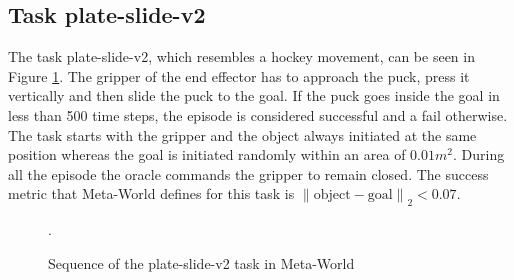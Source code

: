 \subsection{Task plate-slide-v2}
\label{subsection:metaworld-hockey-task}
The task plate-slide-v2, which resembles a hockey movement, can be seen in Figure \ref{fig:sequence-plate-slide}. The gripper of the end effector has to approach the puck, press it vertically and then slide the puck to the goal. If the puck goes inside the goal in less than 500 time steps, the episode is considered successful and a fail otherwise. The task starts with the gripper and the object always initiated at the same position whereas the goal is initiated randomly within an area of  $0.01m^2$. During all the episode the oracle commands the gripper to remain closed. The success metric that Meta-World defines for this task is ${\left\lVert \text{object}-\text{goal} \right\rVert}_2 < 0.07$.

 \begin{figure}[H]
  \centering
  \hspace*{\fill}%
   \hfill
   \hfill
  \hspace*{\fill}%
  \caption{Sequence of the plate-slide-v2 task in Meta-World}.
  \label{fig:sequence-plate-slide}
\end{figure}


